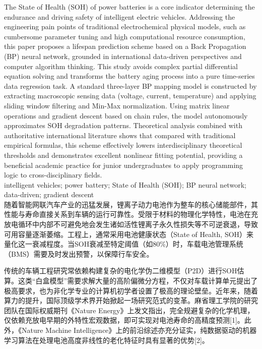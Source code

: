 \documentclass[a4paper,10.5pt]{article}
\begin{document}
 { The State of Health (SOH) of power batteries is a core indicator determining the endurance and driving safety of intelligent electric vehicles. Addressing the engineering pain points of traditional electrochemical physical models, such as cumbersome parameter tuning and high computational resource consumption, this paper proposes a lifespan prediction scheme based on a Back Propagation (BP) neural network, grounded in international data-driven perspectives and computer algorithm thinking. This study avoids complex partial differential equation solving and transforms the battery aging process into a pure time-series data regression task. A standard three-layer BP mapping model is constructed by extracting macroscopic sensing data (voltage, current, temperature) and applying sliding window filtering and Min-Max normalization. Using matrix linear operations and gradient descent based on chain rules, the model autonomously approximates SOH degradation patterns. Theoretical analysis combined with authoritative international literature shows that compared with traditional empirical formulas, this scheme effectively lowers interdisciplinary theoretical thresholds and demonstrates excellent nonlinear fitting potential, providing a beneficial academic practice for junior undergraduates to apply programming logic to cross-disciplinary fields.}\\[5pt]
 { intelligent vehicles; power battery; State of Health (SOH); BP neural network; data-driven; gradient descent}\\[20pt]

随着智能网联汽车产业的迅猛发展，锂离子动力电池作为整车的核心储能部件，其性能与寿命直接关系到车辆的运行可靠性。受限于材料的物理化学特性，电池在充放电循环中内部不可避免地会发生诸如活性锂离子永久性损失等不可逆衰退，导致可用容量逐渐萎缩。工程上，通常采用电池健康状态（State of Health, SOH）来量化这一衰减程度。当SOH衰减至特定阈值（如80\%）时，车载电池管理系统（BMS）需要及时发出预警，以保障行车安全。

传统的车辆工程研究常依赖构建复杂的电化学伪二维模型（P2D）进行SOH估算。这类“白盒模型”需要求解大量的高阶偏微分方程，不仅对车载计算单元提出了极高要求，也为非化学专业的计算机初学者设置了极高的理论壁垒。近年来，随着算力的提升，国际顶级学术界开始掀起一场研究范式的变革。麻省理工学院的研究团队在国际权威期刊《Nature Energy》上发文指出，完全规避复杂的化学机理，仅依赖充放电早期的外特性宏观数据，即可实现对电池寿命的高精度预测[1]。此外，《Nature Machine Intelligence》上的前沿综述亦充分证实，纯数据驱动的机器学习算法在处理电池高度非线性的老化特征时具有显著的优势[2]。
\end{document}
